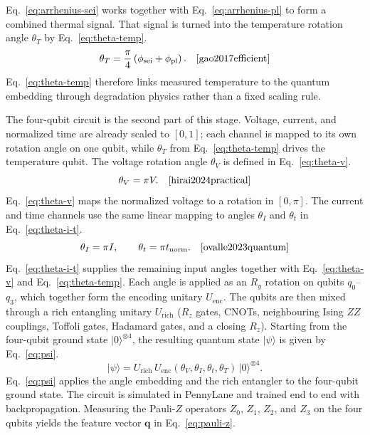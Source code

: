\documentclass[a4paper,fleqn]{cas-sc}
\begin{document}
Eq.~\eqref{eq:arrhenius-sei} works together with Eq.~\eqref{eq:arrhenius-pl} to form a combined thermal signal. That signal is turned into the temperature rotation angle $\theta_T$ by Eq.~\eqref{eq:theta-temp}.
\begin{equation}
\theta_T = \frac{\pi}{4}\left(\phi_{\mathrm{sei}} + \phi_{\mathrm{pl}}\right). \quad \cite{gao2017efficient}
\label{eq:theta-temp}
\end{equation}
Eq.~\eqref{eq:theta-temp} therefore links measured temperature to the quantum embedding through degradation physics rather than a fixed scaling rule. 


The four-qubit circuit is the second part of this stage. Voltage, current, and normalized time are already scaled to $[0,1]$; each channel is mapped to its own rotation angle on one qubit, while $\theta_T$ from Eq.~\eqref{eq:theta-temp} drives the temperature qubit. The voltage rotation angle $\theta_V$ is defined in Eq.~\eqref{eq:theta-v}.
\begin{equation}
\theta_V = \pi V. \quad \cite{hirai2024practical}
\label{eq:theta-v}
\end{equation}
Eq.~\eqref{eq:theta-v} maps the normalized voltage to a rotation in $[0,\pi]$. The current and time channels use the same linear mapping to angles $\theta_I$ and $\theta_t$ in Eq.~\eqref{eq:theta-i-t}.
\begin{equation}
\theta_I = \pi I, \qquad \theta_t = \pi t_{\mathrm{norm}}. \quad \cite{ovalle2023quantum}
\label{eq:theta-i-t}
\end{equation}
Eq.~\eqref{eq:theta-i-t} supplies the remaining input angles together with Eq.~\eqref{eq:theta-v} and Eq.~\eqref{eq:theta-temp}. Each angle is applied as an $R_y$ rotation on qubits $q_0$--$q_3$, which together form the encoding unitary $U_{\mathrm{enc}}$. The qubits are then mixed through a rich entangling unitary $U_{\mathrm{rich}}$ ($R_z$ gates, CNOTs, neighbouring Ising $ZZ$ couplings, Toffoli gates, Hadamard gates, and a closing $R_z$). Starting from the four-qubit ground state $\lvert 0\rangle^{\otimes 4}$, the resulting quantum state $\lvert\psi\rangle$ is given by Eq.~\eqref{eq:psi}.
\begin{equation}
\lvert\psi\rangle
=
U_{\mathrm{rich}}\,
U_{\mathrm{enc}}(\theta_V,\theta_I,\theta_t,\theta_T)\,
\lvert 0\rangle^{\otimes 4}.
\label{eq:psi}
\end{equation}
Eq.~\eqref{eq:psi} applies the angle embedding and the rich entangler to the four-qubit ground state. The circuit is simulated in PennyLane and trained end to end with backpropagation. Measuring the Pauli-$Z$ operators $Z_{0}$, $Z_{1}$, $Z_{2}$, and $Z_{3}$ on the four qubits yields the feature vector $\mathbf{q}$ in Eq.~\eqref{eq:pauli-z}.
\end{document}
